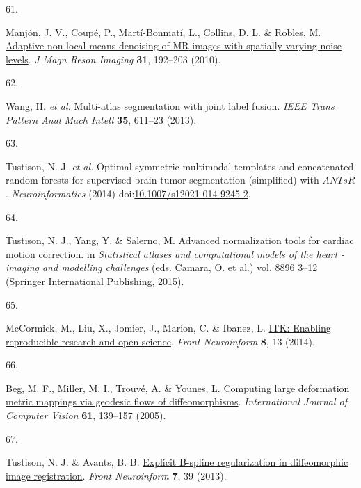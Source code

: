 \documentclass[
  12pt,
]{article}
\newlength{\cslhangindent}
\newlength{\csllabelwidth}
\newenvironment{CSLReferences}[2] %
 {\begin{list}{}{%
  \setlength{\itemindent}{0pt}
  \setlength{\leftmargin}{0pt}
  \setlength{\parsep}{0pt}
  \ifodd #1
   \setlength{\leftmargin}{\cslhangindent}
   \setlength{\itemindent}{-1\cslhangindent}
  \fi
  \setlength{\itemsep}{#2\baselineskip}}}
 {\end{list}}
\newcommand{\CSLLeftMargin}[1]{\parbox[t]{\csllabelwidth}{\strut#1\strut}}
\newcommand{\CSLRightInline}[1]{\parbox[t]{\linewidth - \csllabelwidth}{\strut#1\strut}}
\begin{document}
\begin{CSLReferences}{0}{0}
\CSLLeftMargin{61. }%
\CSLRightInline{Manjón, J. V., Coupé, P., Martí-Bonmatí, L., Collins, D.
L. \& Robles, M. \href{https://doi.org/10.1002/jmri.22003}{Adaptive
non-local means denoising of {MR} images with spatially varying noise
levels}. \emph{J Magn Reson Imaging} \textbf{31}, 192--203 (2010).}

\CSLLeftMargin{62. }%
\CSLRightInline{Wang, H. \emph{et al.}
\href{https://doi.org/10.1109/TPAMI.2012.143}{Multi-atlas segmentation
with joint label fusion}. \emph{IEEE Trans Pattern Anal Mach Intell}
\textbf{35}, 611--23 (2013).}

\CSLLeftMargin{63. }%
\CSLRightInline{Tustison, N. J. \emph{et al.} Optimal symmetric
multimodal templates and concatenated random forests for supervised
brain tumor segmentation (simplified) with {\(ANTsR\)}.
\emph{Neuroinformatics} (2014)
doi:\href{https://doi.org/10.1007/s12021-014-9245-2}{10.1007/s12021-014-9245-2}.}

\CSLLeftMargin{64. }%
\CSLRightInline{Tustison, N. J., Yang, Y. \& Salerno, M.
\href{https://doi.org/10.1007/978-3-319-14678-2_1}{Advanced
normalization tools for cardiac motion correction}. in \emph{Statistical
atlases and computational models of the heart - imaging and modelling
challenges} (eds. Camara, O. et al.) vol. 8896 3--12 (Springer
International Publishing, 2015).}

\CSLLeftMargin{65. }%
\CSLRightInline{McCormick, M., Liu, X., Jomier, J., Marion, C. \&
Ibanez, L. \href{https://doi.org/10.3389/fninf.2014.00013}{ITK: Enabling
reproducible research and open science}. \emph{Front Neuroinform}
\textbf{8}, 13 (2014).}

\CSLLeftMargin{66. }%
\CSLRightInline{Beg, M. F., Miller, M. I., Trouvé, A. \& Younes, L.
\href{https://doi.org/10.1023/B:VISI.0000043755.93987.aa}{Computing
large deformation metric mappings via geodesic flows of
diffeomorphisms}. \emph{International Journal of Computer Vision}
\textbf{61}, 139--157 (2005).}

\CSLLeftMargin{67. }%
\CSLRightInline{Tustison, N. J. \& Avants, B. B.
\href{https://doi.org/10.3389/fninf.2013.00039}{Explicit {B}-spline
regularization in diffeomorphic image registration}. \emph{Front
Neuroinform} \textbf{7}, 39 (2013).}


\end{CSLReferences}
\end{document}
